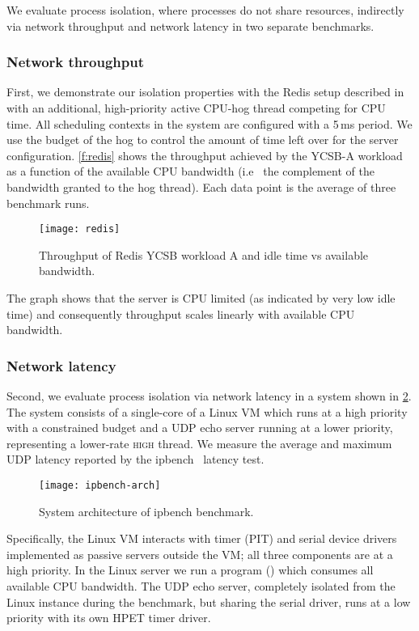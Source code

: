 We evaluate process isolation, where processes do not share resources, indirectly via network
throughput and network latency in two separate benchmarks. 

\subsubsection{Network throughput}

First, we demonstrate our isolation properties with the Redis setup described in
 with an additional, high-priority active CPU-hog thread
competing for \gls{CPU} time.  All scheduling contexts in the system are configured with a
5\,ms period. We use the budget of the hog to control the amount of time left over
for the server configuration. \autoref{f:redis} shows the throughput
achieved by the YCSB-A workload as a function of the available CPU
bandwidth (i.e \ the complement of the bandwidth granted to the hog
thread). Each data point is the average of three benchmark runs.

\begin{figure}[h]
  \centering
  \texttt{[image: redis]}
  \caption{Throughput of Redis YCSB workload A and idle time vs available bandwidth.}
  \label{f:redis}
\end{figure}

The graph shows that the server is CPU limited (as indicated by very low idle time)
and consequently throughput scales linearly with available CPU
bandwidth.

\subsubsection{Network latency}

Second, we evaluate process isolation via network latency in a system shown in \cref{f:ipbench-arch}. 
The system consists of a single-core of a Linux \gls{VM} which runs at a high priority with a
constrained budget and a \gls{UDP} echo server running at a lower priority,
representing a lower-rate \textsc{high} thread. We
measure the average  and maximum UDP latency reported by the
ipbench~\citep{Wienand_Macpherson_04} latency test.

\begin{figure}[h]
    \centering
    \texttt{[image: ipbench-arch]}
    \caption{System architecture of ipbench benchmark.}
    \label{f:ipbench-arch}
\end{figure}


Specifically, the Linux VM interacts with timer (PIT) and serial device drivers implemented as
passive servers outside the \gls{VM}; all three components are at a high priority. In the Linux server we
run a program () which consumes all available
CPU bandwidth.  The UDP echo server, completely isolated from the Linux instance during the
benchmark, but sharing the
serial driver, runs at a low priority with its own HPET timer
driver.

